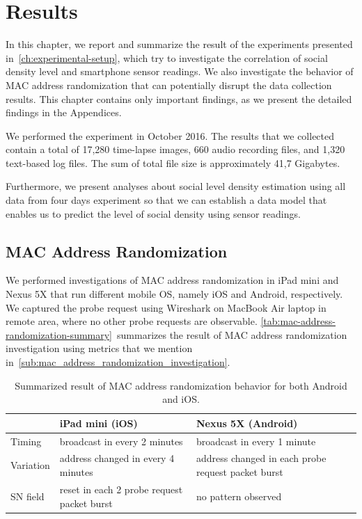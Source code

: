\chapter{Results}
\label{ch:results} %
In this chapter, we report and summarize the result of the experiments presented in~\autoref{ch:experimental-setup}, which try to investigate the correlation of social density level and smartphone sensor readings. We also investigate the behavior of \ac{MAC} address randomization that can potentially disrupt the data collection results. This chapter contains only important findings, as we present the detailed findings in the Appendices.

We performed the experiment in October 2016. The results that we collected contain a total of 17,280 time-lapse images, 660 audio recording files, and 1,320 text-based log files. The sum of total file size is approximately 41,7 Gigabytes.

Furthermore, we present analyses about social level density estimation using all data from four days experiment so that we can establish a data model that enables us to predict the level of social density using sensor readings.

\section{MAC Address Randomization} %
\label{sec:mac-address-randomization}
We performed investigations of \ac{MAC} address randomization in iPad mini and Nexus 5X that run different mobile \ac{OS}, namely iOS and Android, respectively. We captured the probe request using Wireshark on MacBook Air laptop in remote area, where no other probe requests are observable. \autoref{tab:mac-address-randomization-summary}~summarizes the result of \ac{MAC} address randomization investigation using metrics that we mention in~\autoref{sub:mac_address_randomization_investigation}.

\begin{table}[ht]
\centering
\caption[Summarized MAC address randomization behavior]
{Summarized result of \ac{MAC} address randomization behavior for both Android and iOS.}
\label{tab:mac-address-randomization-summary}
\begin{tabularx}{\textwidth}{lXX}
\toprule
                                        & iPad mini (iOS) & Nexus 5X (Android) \\
                                        \midrule
Timing    & broadcast in every 2 minutes & broadcast in every 1 minute \\ 
Variation & address changed in every 4 minutes & address changed in each probe request packet burst \\
\ac{SN} field & reset in each 2 probe request packet burst & no pattern observed \\ \bottomrule
\end{tabularx}
\end{table}

